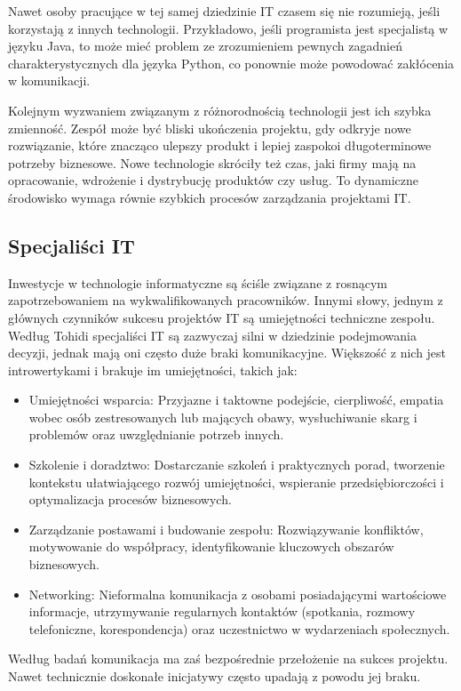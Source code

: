 Nawet osoby pracujące w tej samej dziedzinie IT czasem się nie rozumieją, jeśli korzystają z innych technologii. Przykładowo, jeśli programista jest specjalistą w języku Java, to może mieć problem ze zrozumieniem pewnych zagadnień charakterystycznych dla języka Python, co ponownie może powodować zakłócenia w komunikacji.

Kolejnym wyzwaniem związanym z różnorodnością technologii jest ich szybka zmienność. Zespół może być bliski ukończenia projektu, gdy odkryje nowe rozwiązanie, które znacząco ulepszy produkt i lepiej zaspokoi długoterminowe potrzeby biznesowe. Nowe technologie skróciły też czas, jaki firmy mają na opracowanie, wdrożenie i dystrybucję produktów czy usług. To dynamiczne środowisko wymaga równie szybkich procesów zarządzania projektami IT.\autocite{ITPM}

\subsection{Specjaliści IT}
Inwestycje w technologie informatyczne są ściśle związane z rosnącym zapotrzebowaniem na wykwalifikowanych pracowników. Innymi słowy, jednym z głównych czynników sukcesu projektów IT są umiejętności techniczne zespołu.
Według Tohidi specjaliści IT są zazwyczaj silni w dziedzinie podejmowania decyzji, jednak mają oni często duże braki komunikacyjne.
Większość z nich jest introwertykami i brakuje im umiejętności, takich jak:
\begin{itemize}
    \item Umiejętności wsparcia: Przyjazne i taktowne podejście, cierpliwość, empatia wobec osób zestresowanych lub mających obawy, wysłuchiwanie skarg i problemów oraz uwzględnianie potrzeb innych.
    \item Szkolenie i doradztwo: Dostarczanie szkoleń i praktycznych porad, tworzenie kontekstu ułatwiającego rozwój umiejętności, wspieranie przedsiębiorczości i optymalizacja procesów biznesowych.
    \item Zarządzanie postawami i budowanie zespołu: Rozwiązywanie konfliktów, motywowanie do współpracy, identyfikowanie kluczowych obszarów biznesowych.
    \item Networking: Nieformalna komunikacja z osobami posiadającymi wartościowe informacje, utrzymywanie regularnych kontaktów (spotkania, rozmowy telefoniczne, korespondencja) oraz uczestnictwo w wydarzeniach społecznych.
\end{itemize}

Według badań komunikacja ma zaś bezpośrednie przełożenie na sukces projektu.\autocite{komunikacja} Nawet technicznie doskonałe inicjatywy często upadają z powodu jej braku.\autocite{Tohidi}

